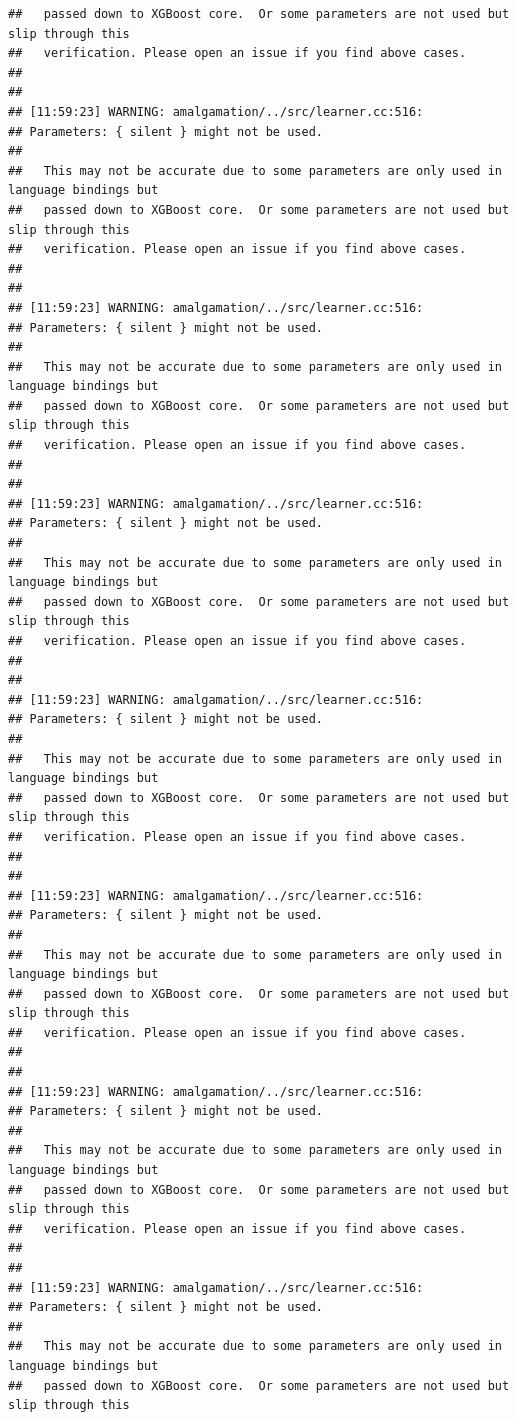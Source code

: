 \documentclass[AMS,STIX2COL]{WileyNJD-v2}\usepackage[]{graphicx}\usepackage[]{color}
\makeatletter
\newenvironment{kframe}{%
 \def\at@end@of@kframe{}%
 \ifinner\ifhmode%
  \def\at@end@of@kframe{\end{minipage}}%
  \begin{minipage}{\columnwidth}%
 \fi\fi%
 \def\FrameCommand##1{\hskip\@totalleftmargin \hskip-\fboxsep
 \colorbox{shadecolor}{##1}\hskip-\fboxsep
     \hskip-\linewidth \hskip-\@totalleftmargin \hskip\columnwidth}%
 \MakeFramed {\advance\hsize-\width
   \@totalleftmargin\z@ \linewidth\hsize
   \@setminipage}}%
 {\par\unskip\endMakeFramed%
 \at@end@of@kframe}
\newenvironment{knitrout}{}{} %
\makeatother
\begin{document}
\begin{knitrout}
\begin{kframe}
\begin{verbatim}
##   passed down to XGBoost core.  Or some parameters are not used but slip through this
##   verification. Please open an issue if you find above cases.
## 
## 
## [11:59:23] WARNING: amalgamation/../src/learner.cc:516: 
## Parameters: { silent } might not be used.
## 
##   This may not be accurate due to some parameters are only used in language bindings but
##   passed down to XGBoost core.  Or some parameters are not used but slip through this
##   verification. Please open an issue if you find above cases.
## 
## 
## [11:59:23] WARNING: amalgamation/../src/learner.cc:516: 
## Parameters: { silent } might not be used.
## 
##   This may not be accurate due to some parameters are only used in language bindings but
##   passed down to XGBoost core.  Or some parameters are not used but slip through this
##   verification. Please open an issue if you find above cases.
## 
## 
## [11:59:23] WARNING: amalgamation/../src/learner.cc:516: 
## Parameters: { silent } might not be used.
## 
##   This may not be accurate due to some parameters are only used in language bindings but
##   passed down to XGBoost core.  Or some parameters are not used but slip through this
##   verification. Please open an issue if you find above cases.
## 
## 
## [11:59:23] WARNING: amalgamation/../src/learner.cc:516: 
## Parameters: { silent } might not be used.
## 
##   This may not be accurate due to some parameters are only used in language bindings but
##   passed down to XGBoost core.  Or some parameters are not used but slip through this
##   verification. Please open an issue if you find above cases.
## 
## 
## [11:59:23] WARNING: amalgamation/../src/learner.cc:516: 
## Parameters: { silent } might not be used.
## 
##   This may not be accurate due to some parameters are only used in language bindings but
##   passed down to XGBoost core.  Or some parameters are not used but slip through this
##   verification. Please open an issue if you find above cases.
## 
## 
## [11:59:23] WARNING: amalgamation/../src/learner.cc:516: 
## Parameters: { silent } might not be used.
## 
##   This may not be accurate due to some parameters are only used in language bindings but
##   passed down to XGBoost core.  Or some parameters are not used but slip through this
##   verification. Please open an issue if you find above cases.
## 
## 
## [11:59:23] WARNING: amalgamation/../src/learner.cc:516: 
## Parameters: { silent } might not be used.
## 
##   This may not be accurate due to some parameters are only used in language bindings but
##   passed down to XGBoost core.  Or some parameters are not used but slip through this

\end{verbatim}
\end{kframe}
\end{knitrout}
\end{document}
